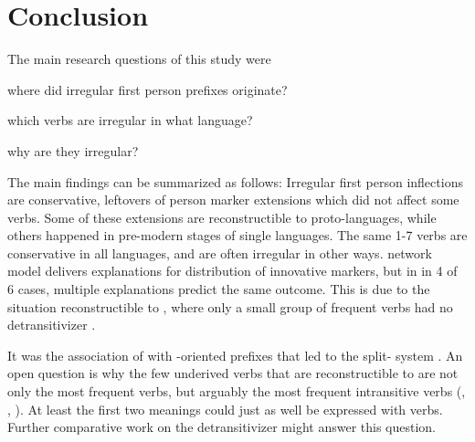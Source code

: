 \section{Conclusion}
\label{sec:discussion}
The main research questions of this study were 
\begin{inlinelistplain}
	\item where did irregular first person prefixes originate?
	\item which verbs are irregular in what language?
	\item why are they irregular?
\end{inlinelistplain}
The main findings can be summarized as follows:
Irregular first person inflections are conservative, leftovers of person marker extensions which did not affect some verbs.
Some of these extensions are reconstructible to proto-languages, while others happened in pre-modern stages of single languages.
The same 1-7 verbs are conservative in all languages, and are often irregular in other ways.
 network model delivers explanations for distribution of innovative markers, but in in 4 of 6 cases, multiple explanations predict the same outcome.
This is due to the situation reconstructible to \PC, where only a small group of frequent  verbs had no detransitivizer \detrz.

It was the association of \detrz with -oriented prefixes that led to the split- system \parencite{meira2000split}.
An open question is why the few underived  verbs that are reconstructible to \PC are not only the most frequent  verbs, but arguably the most frequent intransitive verbs (, , ).
At least the first two meanings could just as well be expressed with  verbs.
Further comparative work on the detransitivizer might answer this question.



